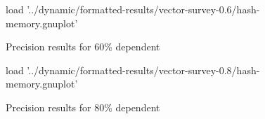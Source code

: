 \begin{figure}[H]
	\centering
	\begin{gnuplot}[terminal=pdf]
	load '../dynamic/formatted-results/vector-survey-0.6/hash-memory.gnuplot'
	\end{gnuplot}
	\caption{Precision results for 60\% dependent}
	\label{chart:memory-0.6-hash}
\end{figure}

\begin{figure}[H]
	\centering
	\begin{gnuplot}[terminal=pdf]
	load '../dynamic/formatted-results/vector-survey-0.8/hash-memory.gnuplot'
	\end{gnuplot}
	\caption{Precision results for 80\% dependent}
	\label{chart:memory-0.8-hash}
\end{figure}